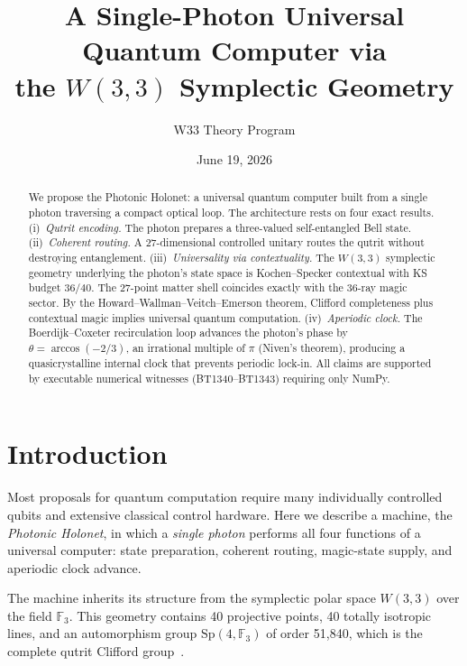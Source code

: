 \documentclass[prl,twocolumn,showpacs,superscriptaddress,longbibliography]{revtex4-2}
\newcommand{\F}{\mathbb{F}}
\newcommand{\Sp}{\mathrm{Sp}}
\newcommand{\W}{W(3,3)}
\begin{document}
\title{A Single-Photon Universal Quantum Computer via\\
the \texorpdfstring{$W(3,3)$}{W(3,3)} Symplectic Geometry}

\author{W33 Theory Program}
\date{June 19, 2026}

\begin{abstract}
We propose the Photonic Holonet: a universal quantum computer
built from a single photon traversing a compact optical loop.
The architecture rests on four exact results.
(i)~\emph{Qutrit encoding.}
The photon prepares a three-valued self-entangled Bell state.
(ii)~\emph{Coherent routing.}
A 27-dimensional controlled unitary routes the qutrit without
destroying entanglement.
(iii)~\emph{Universality via contextuality.}
The $W(3,3)$ symplectic geometry underlying the photon's state
space is Kochen--Specker contextual with KS budget $36/40$.
The 27-point matter shell coincides exactly with the 36-ray magic
sector. By the Howard--Wallman--Veitch--Emerson theorem,
Clifford completeness plus contextual magic implies universal
quantum computation.
(iv)~\emph{Aperiodic clock.}
The Boerdijk--Coxeter recirculation loop advances the photon's
phase by $\theta=\arccos(-2/3)$, an irrational multiple of $\pi$
(Niven's theorem), producing a quasicrystalline internal clock
that prevents periodic lock-in.
All claims are supported by executable numerical witnesses
(BT1340--BT1343) requiring only NumPy.
\end{abstract}

\maketitle

\section{Introduction}

Most proposals for quantum computation require many individually
controlled qubits and extensive classical control hardware.
Here we describe a machine, the \emph{Photonic Holonet}, in which
a \emph{single photon} performs all four functions of a universal
computer: state preparation, coherent routing, magic-state supply,
and aperiodic clock advance.

The machine inherits its structure from the symplectic polar space
$\W$ over the field $\F_3$. This geometry contains 40 projective
points, 40 totally isotropic lines, and an automorphism group
$\Sp(4,\F_3)$ of order 51{,}840, which is the complete qutrit
Clifford group~\cite{bt825}.
\end{document}
